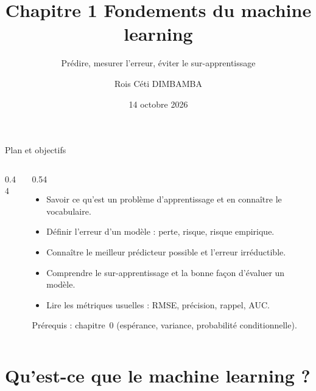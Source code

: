 \documentclass[aspectratio=169,11pt]{beamer}
\title{Chapitre 1 \textendash{} Fondements du machine learning}
\subtitle{Prédire, mesurer l'erreur, éviter le sur-apprentissage}
\author{Rois Céti DIMBAMBA}
\institute{Ingénieur statisticien économiste \textperiodcentered{} Actuaire \textperiodcentered{} \href{https://rdimbamba.shinyapps.io/roisceti_e-cv/}{\textcolor{cnfVert}{CV en ligne}}}
\date{14 octobre 2026}
\begin{document}
\begin{frame}
  \titlepage
\end{frame}

\begin{frame}{Plan et objectifs}
  \begin{columns}[T]
    \begin{column}{0.44\textwidth}
      \footnotesize\tableofcontents
    \end{column}
    \begin{column}{0.54\textwidth}
      \begin{objectifs}
        \footnotesize
        \begin{itemize}
          \item Savoir ce qu'est un problème d'apprentissage et en connaître le vocabulaire.
          \item Définir l'erreur d'un modèle : perte, risque, risque empirique.
          \item Connaître le meilleur prédicteur possible et l'erreur irréductible.
          \item Comprendre le sur-apprentissage et la bonne façon d'évaluer un modèle.
          \item Lire les métriques usuelles : RMSE, précision, rappel, AUC.
        \end{itemize}
      \end{objectifs}
      \vskip-1mm{\scriptsize\color{cnfGris}Prérequis : chapitre~0 (espérance, variance, probabilité conditionnelle).}
    \end{column}
  \end{columns}
\end{frame}

\section{Qu'est-ce que le machine learning ?}
\end{document}

